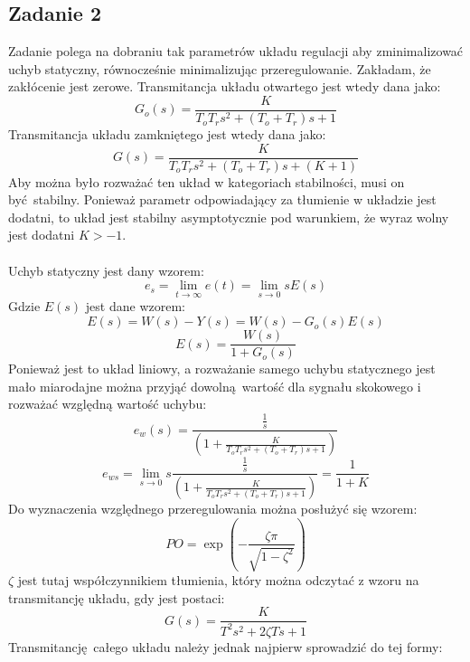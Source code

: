 \documentclass[a4paper, 12pt]{article}
\begin{document}
        \subsection{Zadanie 2}
            Zadanie polega na dobraniu tak parametrów układu regulacji aby zminimalizować uchyb
            statyczny, równocześnie minimalizując przeregulowanie. Zakładam, że zakłócenie jest
            zerowe. Transmitancja układu otwartego jest wtedy dana jako:
            $$
                G_o(s) = \frac{K}{T_oT_rs^2 + (T_o + T_r)s + 1}
            $$
            Transmitancja układu zamkniętego jest wtedy dana jako:
            $$
                G(s) = \frac{K}{T_oT_rs^2 + (T_o + T_r)s + (K + 1)}
            $$
            Aby można było rozważać ten układ w kategoriach stabilności, musi on być stabilny. Ponieważ
            parametr odpowiadający za tłumienie w układzie jest dodatni, to układ jest stabilny
            asymptotycznie pod warunkiem, że wyraz wolny jest dodatni $K > -1$.
            \\ \\
            Uchyb statyczny jest dany wzorem:
            $$
                e_s =  \lim_{t \to \infty} e(t) = \lim_{s \to 0} sE(s)
            $$
            Gdzie $E(s)$ jest dane wzorem:
            $$
                E(s) = W(s) - Y(s) = W(s) - G_o(s) E(s)
            $$
            $$
                E(s) = \frac{W(s)}{1 + G_o(s)}
            $$
            Ponieważ jest to układ liniowy, a rozważanie samego uchybu statycznego jest mało miarodajne
            można przyjąć dowolną wartość dla sygnału skokowego i rozważać względną wartość uchybu:
            $$
                e_w(s) = \frac{\frac{1}{s}}{(1 + \frac{K}{T_oT_rs^2 + (T_o + T_r)s + 1})}
            $$
            $$
                e_{ws} = \lim_{s \to 0} s \frac{\frac{1}{s}}{(1 + \frac{K}{T_oT_rs^2 + 
                    (T_o + T_r)s + 1})} = \frac{1}{1 + K}
            $$
            Do wyznaczenia względnego przeregulowania można posłużyć się wzorem:
            \begin{equation}
                PO = \exp\left(
                    - \frac{\zeta \pi}{\sqrt{1 - \zeta^2}}
                \right)
                \label{eq:overshoot}
            \end{equation}
            $\zeta$ jest tutaj współczynnikiem tłumienia, który można odczytać z wzoru na transmitancję
            układu, gdy jest postaci:
            $$
                G(s) = \frac{K}{T^2s^2 + 2\zeta Ts + 1}
            $$
            Transmitancję całego układu należy jednak najpierw sprowadzić do tej formy:
\end{document}
